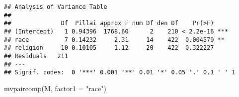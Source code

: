 \documentclass[
]{article}
\newenvironment{Shaded}{\begin{snugshade}}{\end{snugshade}}
\newcommand{\AttributeTok}[1]{\textcolor[rgb]{0.77,0.63,0.00}{#1}}
\newcommand{\FunctionTok}[1]{\textcolor[rgb]{0.00,0.00,0.00}{#1}}
\newcommand{\NormalTok}[1]{#1}
\newcommand{\StringTok}[1]{\textcolor[rgb]{0.31,0.60,0.02}{#1}}
\begin{document}
\begin{verbatim}
## Analysis of Variance Table
## 
##              Df  Pillai approx F num Df den Df    Pr(>F)    
## (Intercept)   1 0.94396  1768.60      2    210 < 2.2e-16 ***
## race          7 0.14232     2.31     14    422  0.004579 ** 
## religion     10 0.10105     1.12     20    422  0.322227    
## Residuals   211                                             
## ---
## Signif. codes:  0 '***' 0.001 '**' 0.01 '*' 0.05 '.' 0.1 ' ' 1
\end{verbatim}

\begin{Shaded}
\begin{Highlighting}[]
\FunctionTok{mvpaircomp}\NormalTok{(M, }\AttributeTok{factor1 =} \StringTok{"race"}\NormalTok{)}
\end{Highlighting}
\end{Shaded}
\end{document}
